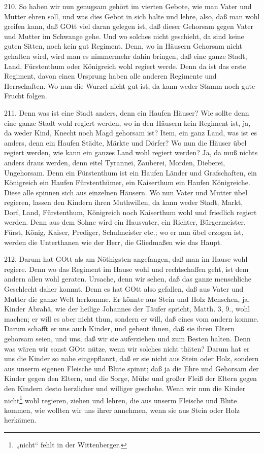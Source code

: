 210. So haben wir nun genugsam gehört im vierten Gebote, wie man Vater und Mutter ehren soll, und was dies Gebot in sich halte und lehre, also, daß man wohl greifen kann, daß GOtt viel daran gelegen ist, daß dieser Gehorsam gegen Vater und Mutter im Schwange gehe. Und wo solches nicht geschieht, da sind keine guten Sitten, noch kein gut Regiment. Denn, wo in Häusern Gehorsam nicht gehalten wird, wird man es nimmermehr dahin bringen, daß eine ganze Stadt, Land, Fürstenthum oder Königreich wohl regiert werde. Denn da ist das erste Regiment, davon einen Ursprung haben alle anderen Regimente und Herrschaften. Wo nun die Wurzel nicht gut ist, da kann weder Stamm noch gute Frucht folgen.

211. Denn was ist eine Stadt anders, denn ein Haufen Häuser? Wie sollte denn eine ganze Stadt wohl regiert werden, wo in den Häusern kein Regiment ist, ja, da weder Kind, Knecht noch Magd gehorsam ist? Item, ein ganz Land, was ist es anders, denn ein Haufen Städte, Märkte und Dörfer? Wo nun die Häuser übel regiert werden, wie kann ein ganzes Land wohl regiert werden? Ja, da muß nichts anders draus werden, denn eitel Tyrannei, Zauberei, Morden, Dieberei, Ungehorsam. Denn ein Fürstenthum ist ein Haufen Länder und Grafschaften, ein Königreich ein Haufen Fürstenthümer, ein Kaiserthum ein Haufen Königreiche. Diese alle spinnen sich aus einzelnen Häusern. Wo nun Vater und Mutter übel regieren, lassen den Kindern ihren Muthwillen, da kann weder Stadt, Markt, Dorf, Land, Fürstenthum, Königreich noch Kaiserthum wohl und friedlich regiert werden. Denn aus dem Sohne wird ein Hausvater, ein Richter, Bürgermeister, Fürst, König, Kaiser, Prediger, Schulmeister etc.; wo er nun übel erzogen ist, werden die Unterthanen wie der Herr, die Gliedmaßen wie das Haupt.

212. Darum hat GOtt als am Nöthigsten angefangen, daß man im Hause wohl regiere. Denn wo das Regiment im Hause wohl und rechtschaffen geht, ist dem andern allen wohl geraten. Ursache, denn wir sehen, daß das ganze menschliche Geschlecht daher kommt. Denn es hat GOtt also gefallen, daß aus Vater und Mutter die ganze Welt herkomme. Er könnte aus Stein und Holz Menschen, ja, Kinder Abrahä, wie der heilige Johannes der Täufer spricht, Matth. 3, 9., wohl machen; er will es aber nicht thun, sondern er will, daß eines vom andern komme. Darum schafft er uns auch Kinder, und gebeut ihnen, daß sie ihren Eltern gehorsam seien, und uns, daß wir sie auferziehen und zum Besten halten. Denn was wären wir sonst GOtt nütze, wenn wir solches nicht thäten? Darum hat er uns die Kinder so nahe eingepflanzt, daß er sie nicht aus Stein oder Holz, sondern aus unserm eigenen Fleische und Blute spinnt; daß ja die Ehre und Gehorsam der Kinder gegen den Eltern, und die Sorge, Mühe und großer Fleiß der Eltern gegen den Kindern desto herzlicher und williger geschehe. Wenn wir nun die Kinder nicht\footnote{„nicht“ fehlt in der Wittenberger.} wohl regieren, ziehen und lehren, die aus unserm Fleische und Blute kommen, wie wollten wir uns ihrer annehmen, wenn sie aus Stein oder Holz herkämen.

